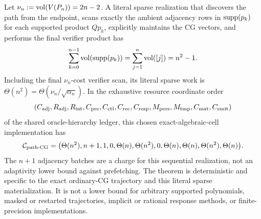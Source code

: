 \documentclass[11pt]{article}
\begin{document}
\begin{theorem}
Let $\nu_n:=\operatorname{vol}(V(P_n))=2n-2$.  A literal sparse realization that discovers
the path from the endpoint, scans exactly the ambient adjacency rows in
$\operatorname{supp}(p_k)$ for each supported product $Qp_k$, explicitly maintains the CG
vectors, and performs the final verifier product has
\begin{equation}
 \sum_{k=0}^{n-1}\operatorname{vol}(\operatorname{supp}(p_k))
 =\sum_{j=1}^{n}\operatorname{vol}([j])=n^2-1.
 \label{eq:path-cg-prefix-work}
\end{equation}
Including the final $\nu_n$-cost verifier scan, its literal sparse work is
$\Theta(n^2)=\Theta(\nu_n/\sqrt{\alpha_n})$.  In the exhaustive resource
coordinate order
\begin{equation*}
 (C_{\rm adj},R_{\rm adj},R_{\rm int},C_{\rm pre},C_{\rm ctl},C_{\rm rec},
 C_{\rm resp},M_{\rm pers},M_{\rm tmp},C_{\rm mat},C_{\rm emit})
\end{equation*}
of the shared oracle-hierarchy ledger, this chosen exact-algebraic-cell
implementation has
\begin{equation}
 \mathcal C_{\rm path\text{-}CG}
 =\bigl(
 \Theta(n^2),n+1,1,0,\Theta(n),\Theta(n^2),0,
 \Theta(n),\Theta(n),\Theta(n^2),\Theta(n)
 \bigr).
 \label{eq:path-cg-eleven-resource-vector}
\end{equation}
The $n+1$ adjacency batches are a charge for this sequential realization,
not an adaptivity lower bound against prefetching.  The theorem is
deterministic and specific to the exact ordinary-CG trajectory and this
literal sparse materialization.  It is not a lower bound for arbitrary
supported polynomials, masked or restarted trajectories, implicit or
rational response methods, or finite-precision implementations.
\end{theorem}
\end{document}
